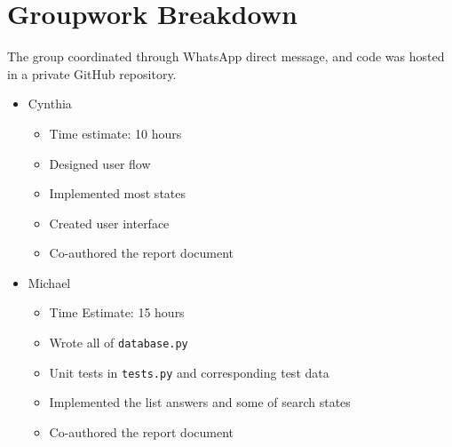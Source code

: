 \documentclass{article}
\begin{document}




\section{Groupwork Breakdown}

The group coordinated through WhatsApp direct message, and code was hosted in a private GitHub repository.

\begin{itemize}
    \item Cynthia
          \begin{itemize}
              \item Time estimate: 10 hours
              \item Designed user flow
              \item Implemented most states
              \item Created user interface
              \item Co-authored the report document
          \end{itemize}
    \item Michael
          \begin{itemize}
              \item Time Estimate: 15 hours
              \item Wrote all of \verb|database.py|
              \item Unit tests in \verb|tests.py| and corresponding test data
              \item Implemented the list answers and some of search states
              \item Co-authored the report document
          \end{itemize}
\end{itemize}
\end{document}
